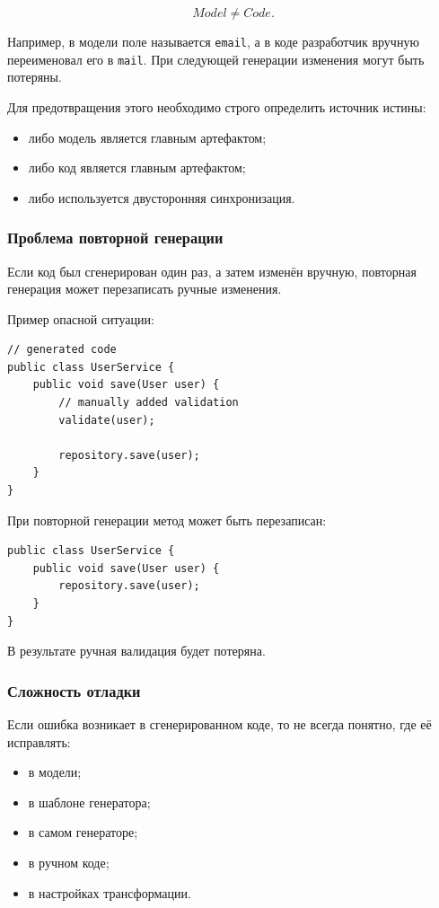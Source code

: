 \documentclass[12pt,a4paper]{article}
\begin{document}
\[
    Model \neq Code.
\]

Например, в модели поле называется \texttt{email}, а в коде разработчик вручную переименовал его в \texttt{mail}. При следующей генерации изменения могут быть потеряны.

Для предотвращения этого необходимо строго определить источник истины:

\begin{itemize}
    \item либо модель является главным артефактом;
    \item либо код является главным артефактом;
    \item либо используется двусторонняя синхронизация.
\end{itemize}

\subsubsection{Проблема повторной генерации}

Если код был сгенерирован один раз, а затем изменён вручную, повторная генерация может перезаписать ручные изменения.

Пример опасной ситуации:

\begin{verbatim}
// generated code
public class UserService {
    public void save(User user) {
        // manually added validation
        validate(user);

        repository.save(user);
    }
}
\end{verbatim}

При повторной генерации метод может быть перезаписан:

\begin{verbatim}
public class UserService {
    public void save(User user) {
        repository.save(user);
    }
}
\end{verbatim}

В результате ручная валидация будет потеряна.

\subsubsection{Сложность отладки}

Если ошибка возникает в сгенерированном коде, то не всегда понятно, где её исправлять:

\begin{itemize}
    \item в модели;
    \item в шаблоне генератора;
    \item в самом генераторе;
    \item в ручном коде;
    \item в настройках трансформации.
\end{itemize}
\end{document}
